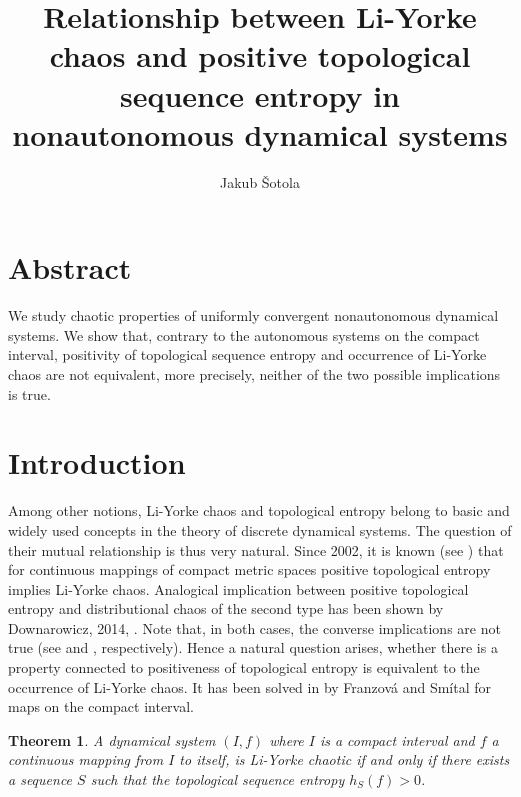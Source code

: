 \documentclass{amsart}
\title[Li-Yorke chaos and positive topological sequence entropy in NDS]{Relationship between Li-Yorke chaos and positive topological sequence entropy in nonautonomous dynamical systems}
\author[J. \v{S}otola]{Jakub \v{S}otola}
\newtheorem{theorem}{Theorem}
\begin{document}
\maketitle

\section*{Abstract}
We study chaotic properties of uniformly convergent nonautonomous dynamical systems. We show that, contrary to the autonomous systems on the compact interval, positivity of topological sequence entropy and occurrence of Li-Yorke chaos are not equivalent, more precisely, neither of the two possible implications is true.

\section{Introduction}
Among other notions, Li-Yorke chaos and topological entropy belong to basic and widely used concepts in the theory of discrete dynamical systems. The question of their mutual relationship is thus very natural. Since 2002, it is known (see \cite{BGKM}) that for continuous mappings of compact metric spaces positive topological entropy implies Li-Yorke chaos. Analogical implication between positive topological entropy and distributional chaos of the second type has been shown by Downarowicz, 2014, \cite{Downar}. Note that, in both cases, the converse implications are not true (see \cite{Smit} and \cite{FPS}, respectively). Hence a natural question arises, whether there is a property connected to positiveness of topological entropy is equivalent to the occurrence of Li-Yorke chaos. It has been solved in \cite{FS} by Franzov\'{a} and Sm\'{i}tal for maps on the compact interval.

\begin{theorem}
\label{FSthm}
A dynamical system $(I,f)$ where $I$ is a compact interval and $f$ a continuous mapping from $I$ to itself, is Li-Yorke chaotic if and only if there exists a sequence $S$ such that the topological sequence entropy $h_S(f) > 0$.
\end{theorem}


\end{document}
